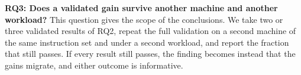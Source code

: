 \noindent\textbf{RQ3: Does a validated gain survive another machine and another workload?}
This question gives the scope of the conclusions.
We take two or three validated results of RQ2, repeat the full validation on a second machine of the same instruction set and under a second workload, and report the fraction that still passes.
If every result still passes, the finding becomes instead that the gains migrate, and either outcome is informative.
